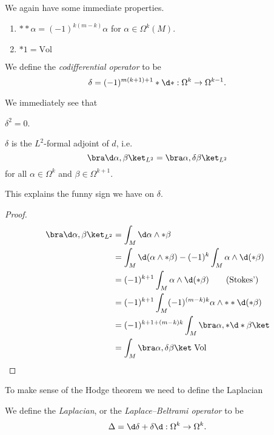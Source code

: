 \documentclass[a4paper]{article}
\newcommand\Vol{\mathrm{Vol}}
\begin{document}
We again have some immediate properties.
\begin{prop}\leavevmode
  \begin{enumerate}
    \item $**\alpha = (-1)^{k(m - k)} \alpha$ for $\alpha \in \Omega^k(M)$.
    \item $*1 = \Vol$
  \end{enumerate}
\end{prop}

\begin{defi}\index{$\delta$}
  We define the \emph{codifferential operator} to be
  \[
    \delta = (-1)^{m(k + 1) + 1} *\d * : \Omega^k \to \Omega^{k - 1}.
  \]
\end{defi}

We immediately see that
\begin{prop}
  $\delta^2 = 0$.
\end{prop}

\begin{prop}
  $\delta$ is the $L^2$-formal adjoint of $d$, i.e.
  \[
    \bra \d \alpha, \beta\ket_{L^2} = \bra \alpha, \delta \beta\ket_{L^2}
  \]
  for all $\alpha \in \Omega^k$ and $\beta \in \Omega^{k + 1}$.
\end{prop}
This explains the funny sign we have on $\delta$.

\begin{proof}
  \begin{align*}
    \bra \d \alpha, \beta \ket_{L^2} &= \int_M \d \alpha \wedge * \beta\\
    &= \int_M \d (\alpha \wedge *\beta) - (-1)^k \int_M \alpha \wedge \d (*\beta)\\
    &= (-1)^{k + 1} \int_M \alpha \wedge \d (*\beta)\tag{Stokes'}\\
    &= (-1)^{k + 1} \int_M (-1)^{(m - k)k} \alpha \wedge **\d (*\beta)\\
    &= (-1)^{k + 1 + (m - k)k} \int_M \bra \alpha, *\d*\beta\ket\\
    &= \int_M \bra \alpha, \delta \beta \ket\;\Vol\qedhere
  \end{align*}
\end{proof}

To make sense of the Hodge theorem we need to define the Laplacian
\begin{defi}
  We define the \emph{Laplacian}, or the \emph{Laplace--Beltrami operator} to be
  \[
    \Delta = \d \delta + \delta \d: \Omega^k \to \Omega^k.
  \]
\end{defi}
\end{document}
